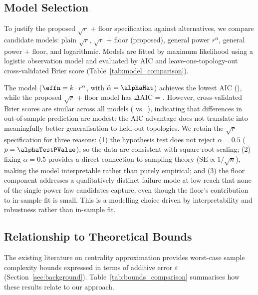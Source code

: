 \subsection{Model Selection}

To justify the proposed $\sqrt{r}$ + floor specification against alternatives, we compare \nModelsCompared{} candidate models: plain $\sqrt{r}$, $\sqrt{r}$ + floor (proposed), general power $r^{\alpha}$, general power + floor, and logarithmic. Models are fitted by maximum likelihood using a logistic observation model and evaluated by AIC and leave-one-topology-out cross-validated Brier score (Table~\ref{tab:model_comparison}).

The \bestModelName{} model ($\effn = k \cdot r^{\alpha}$, with $\hat{\alpha} = \alphaHat$) achieves the lowest AIC (\bestModelAIC), while the proposed $\sqrt{r}$ + floor model has $\Delta$AIC = \proposedDeltaAIC. However, cross-validated Brier scores are similar across all models (\bestModelBrier{} vs.\ \proposedModelBrier{}), indicating that differences in out-of-sample prediction are modest: the AIC advantage does not translate into meaningfully better generalisation to held-out topologies. We retain the $\sqrt{r}$ specification for three reasons: (1) the hypothesis test does not reject $\alpha = 0.5$ ($p = \alphaTestPValue$), so the data are consistent with square root scaling; (2) fixing $\alpha = 0.5$ provides a direct connection to sampling theory ($\text{SE} \propto 1/\sqrt{n}$), making the model interpretable rather than purely empirical; and (3) the floor component addresses a qualitatively distinct failure mode at low reach that none of the single power law candidates capture, even though the floor's contribution to in-sample fit is small. This is a modelling choice driven by interpretability and robustness rather than in-sample fit.



\subsection{Relationship to Theoretical Bounds}
\label{sec:bounds}

The existing literature on centrality approximation provides worst-case sample complexity bounds expressed in terms of additive error $\varepsilon$ (Section~\ref{sec:background}). Table~\ref{tab:bounds_comparison} summarises how these results relate to our approach.

